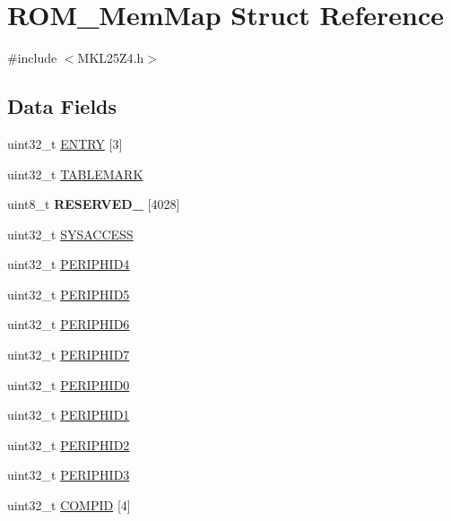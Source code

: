 \hypertarget{struct_r_o_m___mem_map}{}\section{R\+O\+M\+\_\+\+Mem\+Map Struct Reference}
\label{struct_r_o_m___mem_map}


{\ttfamily \#include $<$M\+K\+L25\+Z4.\+h$>$}

\subsection*{Data Fields}
\begin{DoxyCompactItemize}
\item 
uint32\+\_\+t \hyperlink{struct_r_o_m___mem_map_ac9643acfd3ab0c1727bccbe356815321}{E\+N\+T\+R\+Y} \mbox{[}3\mbox{]}
\item 
uint32\+\_\+t \hyperlink{struct_r_o_m___mem_map_af2183c9d5dbc69a514ecef0aa2d22ed3}{T\+A\+B\+L\+E\+M\+A\+R\+K}
\item 
\hypertarget{struct_r_o_m___mem_map_a0de996dea396cfe98eb44e61dbdff57d}{}uint8\+\_\+t {\bfseries R\+E\+S\+E\+R\+V\+E\+D\+\_} \mbox{[}4028\mbox{]}\label{struct_r_o_m___mem_map_a0de996dea396cfe98eb44e61dbdff57d}

\item 
uint32\+\_\+t \hyperlink{struct_r_o_m___mem_map_ad414e4ce56e0dd2d8b7c2c2b8e10b1d2}{S\+Y\+S\+A\+C\+C\+E\+S\+S}
\item 
uint32\+\_\+t \hyperlink{struct_r_o_m___mem_map_a5bb92c53c9f9ff95c2fa012895bb158e}{P\+E\+R\+I\+P\+H\+I\+D4}
\item 
uint32\+\_\+t \hyperlink{struct_r_o_m___mem_map_a3537d737a5805be883aaf9c707789779}{P\+E\+R\+I\+P\+H\+I\+D5}
\item 
uint32\+\_\+t \hyperlink{struct_r_o_m___mem_map_ae80800c5fd92b8bfb3b45ae430e4dc9b}{P\+E\+R\+I\+P\+H\+I\+D6}
\item 
uint32\+\_\+t \hyperlink{struct_r_o_m___mem_map_ab63254ed09fdb6e681bf911fcb73012c}{P\+E\+R\+I\+P\+H\+I\+D7}
\item 
uint32\+\_\+t \hyperlink{struct_r_o_m___mem_map_a132adcf08b28d082698e505ef4cd84ab}{P\+E\+R\+I\+P\+H\+I\+D0}
\item 
uint32\+\_\+t \hyperlink{struct_r_o_m___mem_map_addf6cf7faa9485773a8f5ffd1d243667}{P\+E\+R\+I\+P\+H\+I\+D1}
\item 
uint32\+\_\+t \hyperlink{struct_r_o_m___mem_map_a9ebe3d5d12893e66b6b39ecba5641561}{P\+E\+R\+I\+P\+H\+I\+D2}
\item 
uint32\+\_\+t \hyperlink{struct_r_o_m___mem_map_a511011f97888761a394521be78887fd2}{P\+E\+R\+I\+P\+H\+I\+D3}
\item 
uint32\+\_\+t \hyperlink{struct_r_o_m___mem_map_a51d2026476b6e1547beb909d07d4aa32}{C\+O\+M\+P\+I\+D} \mbox{[}4\mbox{]}
\end{DoxyCompactItemize}


